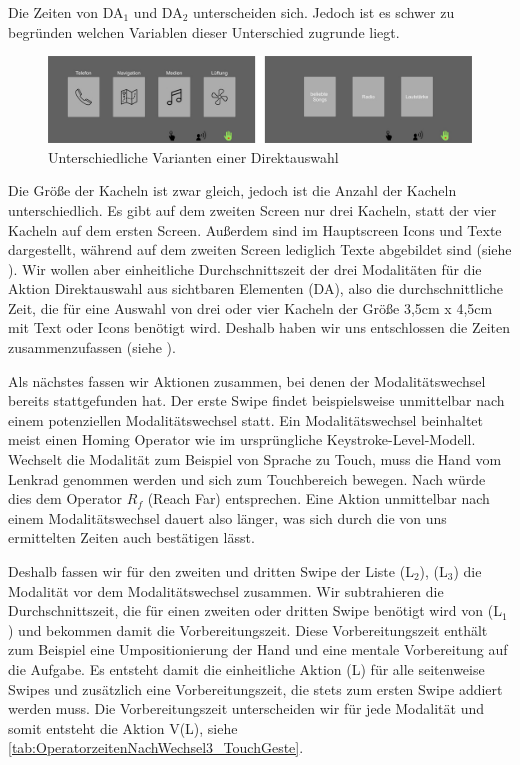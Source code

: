Die Zeiten von DA$_1$ und DA$_2$ unterscheiden sich.
Jedoch ist es schwer zu begründen welchen Variablen dieser Unterschied zugrunde liegt.
\begin{figure}[ht]
	\centering
		\includegraphics[width=1\textwidth]{img/Screen1vsScreen2.JPG}
	\caption{Unterschiedliche Varianten einer Direktauswahl}
	\label{fig:Screen1vsScreen2}
\end{figure}
Die Größe der Kacheln ist zwar gleich, jedoch ist die Anzahl der Kacheln unterschiedlich.
Es gibt auf dem zweiten Screen nur drei Kacheln, statt der vier Kacheln auf dem ersten Screen.
Außerdem sind im Hauptscreen Icons und Texte dargestellt, während auf dem zweiten Screen lediglich Texte abgebildet sind (siehe ).
Wir wollen aber einheitliche Durchschnittszeit der drei Modalitäten für die Aktion Direktauswahl aus sichtbaren Elementen (DA), also die durchschnittliche Zeit, die für eine Auswahl von drei oder vier Kacheln der Größe 3,5cm x 4,5cm mit Text oder Icons benötigt wird.
Deshalb haben wir uns entschlossen die Zeiten zusammenzufassen (siehe ).

Als nächstes fassen wir Aktionen zusammen, bei denen der Modalitätswechsel bereits stattgefunden hat.
Der erste Swipe findet beispielsweise unmittelbar nach einem potenziellen Modalitätswechsel statt.
Ein Modalitätswechsel beinhaltet meist einen Homing Operator wie im ursprüngliche Keystroke-Level-Modell.
Wechselt die Modalität zum Beispiel von Sprache zu Touch, muss die Hand vom Lenkrad genommen werden und sich zum Touchbereich bewegen.
Nach \citet{Green_2002} würde dies dem Operator $R_f$ (Reach Far) entsprechen.
Eine Aktion unmittelbar nach einem Modalitätswechsel dauert also länger, was sich durch die von uns ermittelten Zeiten auch bestätigen lässt.

Deshalb fassen wir für den zweiten und dritten Swipe der Liste (L$_2$), (L$_3$) die Modalität vor dem Modalitätswechsel zusammen.
Wir subtrahieren die Durchschnittszeit, die für einen zweiten oder dritten Swipe benötigt wird von (L$_1$) und bekommen damit die Vorbereitungszeit.
Diese Vorbereitungszeit enthält zum Beispiel eine Umpositionierung der Hand und eine mentale Vorbereitung auf die Aufgabe.
Es entsteht damit die einheitliche Aktion (L) für alle seitenweise Swipes und zusätzlich eine Vorbereitungszeit, die stets zum ersten Swipe addiert werden muss.
Die Vorbereitungszeit unterscheiden wir für jede Modalität und somit entsteht die Aktion V(L), siehe \ref{tab:OperatorzeitenNachWechsel3_TouchGeste}.
 
